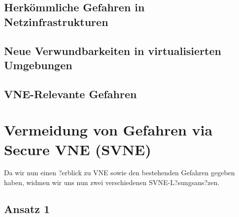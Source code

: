 \documentclass{lni}
\begin{document}
\subsection{Herkömmliche Gefahren in Netzinfrastrukturen}
\label{subsec:gefahren_allg}



\subsection{Neue Verwundbarkeiten in virtualisierten Umgebungen}
\label{subsec:gefahren_virt}



\subsection{VNE-Relevante Gefahren}
\label{subsec:gefahren_vnerelevant}	


\section{Vermeidung von Gefahren via Secure VNE (SVNE)}
\label{sec:svne}
Da wir nun einen ?erblick zu VNE sowie den bestehenden Gefahren gegeben haben, widmen wir uns nun zwei verschiedenen SVNE-L?sungsans?zen.

\subsection{Ansatz 1}
\end{document}

